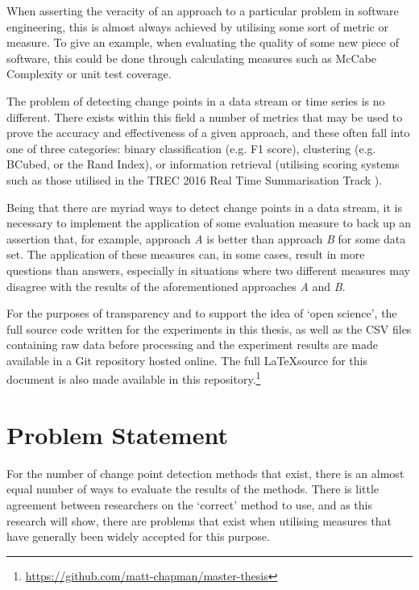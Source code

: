 \documentclass[../main.tex]{subfiles}
\begin{document}
When asserting the veracity of an approach to a particular problem in software engineering, this is almost always achieved by utilising some sort of metric or measure. To give an example, when evaluating the quality of some new piece of software, this could be done through calculating measures such as McCabe Complexity \cite{ThomasJ.McCabe1976} or unit test coverage.

The problem of detecting change points in a data stream or time series is no different. There exists within this field a number of metrics that may be used to prove the accuracy and effectiveness of a given approach, and these often fall into one of three categories: binary classification (e.g. F1 score), clustering (e.g. BCubed, or the Rand Index), or information retrieval (utilising scoring systems such as those utilised in the TREC 2016 Real Time Summarisation Track \cite{trec2016}).

Being that there are myriad ways to detect change points in a data stream, it is necessary to implement the application of some evaluation measure to back up an assertion that, for example, approach \emph{A} is better than approach \emph{B} for some data set. The application of these measures can, in some cases, result in more questions than answers, especially in situations where two different measures may disagree with the results of the aforementioned approaches \emph{A} and \emph{B}.

For the purposes of transparency and to support the idea of `open science', the full source code written for the experiments in this thesis, as well as the CSV files containing raw data before processing and the experiment results are made available in a Git repository hosted online. The full \LaTeX source for this document is also made available in this repository.\footnote{\url{https://github.com/matt-chapman/master-thesis}}

\section{Problem Statement}
\label{Problem Statement}

For the number of change point detection methods that exist, there is an almost equal number of ways to evaluate the results of the methods. There is little agreement between researchers on the `correct' method to use, and as this research will show, there are problems that exist when utilising measures that have generally been widely accepted for this purpose.
\end{document}
